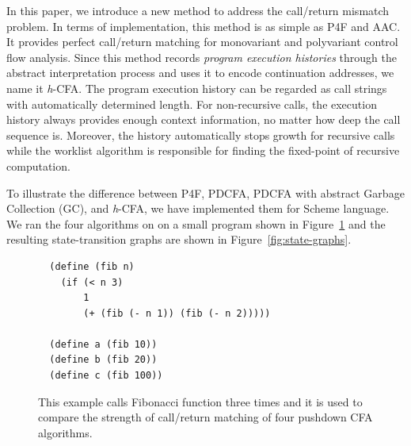\documentclass{article}
\begin{document}
In this paper, we introduce a new method to address the call/return mismatch problem.
In terms of implementation, this method is as simple as P4F and AAC\@.
It provides perfect call/return matching for monovariant and polyvariant control flow analysis.
Since this method records \emph{program execution histories} through the abstract interpretation process and uses it to encode continuation addresses, we name it \textit{h}-CFA\@.
The program execution history can be regarded as call strings with automatically determined length.
For non-recursive calls, the execution history always provides enough context information, no matter how deep the call sequence is.
Moreover, the history automatically stops growth for recursive calls while the worklist algorithm is responsible
for finding the fixed-point of recursive computation.

To illustrate the difference between P4F, PDCFA, PDCFA with abstract Garbage Collection (GC), and \textit{h}-CFA, we have
implemented them for Scheme language. We ran the four algorithms on on a small program shown in Figure~\ref{fig:fib} and
the resulting state-transition graphs are shown in Figure~\ref{fig:state-graphs}.

\begin{figure}
  \small
  \begin{lstlisting}
  (define (fib n)
    (if (< n 3)
        1
        (+ (fib (- n 1)) (fib (- n 2)))))

  (define a (fib 10))
  (define b (fib 20))
  (define c (fib 100))
  \end{lstlisting}
\caption{
This example calls Fibonacci function three times
and it is used to compare the strength of call/return matching of four pushdown CFA algorithms.
}
\label{fig:fib}
\end{figure}
\end{document}
